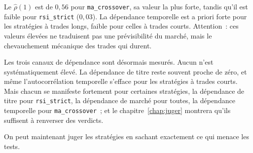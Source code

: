 Le $\hat\rho(1)$ est de $0{,}56$ pour \texttt{ma\_crossover}, sa valeur la plus
forte, tandis qu'il est faible pour \texttt{rsi\_strict} ($0{,}03$).
La dépendance temporelle est a priori forte pour les stratégies
à trades longs, faible pour celles à trades courts. Attention~:
ces valeurs élevées ne traduisent pas une prévisibilité du
marché, mais le chevauchement mécanique des trades qui durent.

Les trois canaux de dépendance sont désormais mesurés. Aucun n'est
systématiquement élevé. La dépendance de titre reste souvent proche de zéro,
et même l'autocorrélation temporelle s'efface pour les stratégies à trades
courts. Mais chacun se manifeste fortement pour certaines stratégies, la
dépendance de titre pour \texttt{rsi\_strict}, la dépendance de marché pour
toutes, la dépendance temporelle pour \texttt{ma\_crossover}~; et le
chapitre~\ref{chap:juger} montrera qu'ils suffisent à renverser des verdicts.

On peut maintenant juger les stratégies en sachant exactement ce qui menace
les tests.
